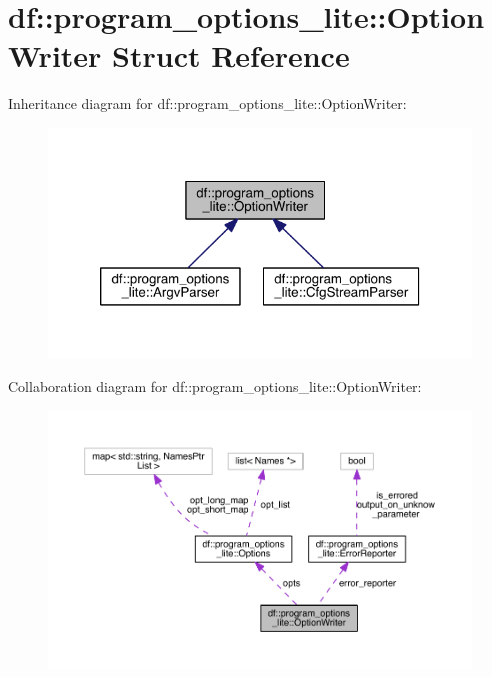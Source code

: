 \hypertarget{structdf_1_1program__options__lite_1_1_option_writer}{}\section{df\+:\+:program\+\_\+options\+\_\+lite\+:\+:Option\+Writer Struct Reference}
\label{structdf_1_1program__options__lite_1_1_option_writer}


Inheritance diagram for df\+:\+:program\+\_\+options\+\_\+lite\+:\+:Option\+Writer\+:
\nopagebreak
\begin{figure}[H]
\begin{center}
\leavevmode
\includegraphics[width=320pt]{df/d1f/structdf_1_1program__options__lite_1_1_option_writer__inherit__graph}
\end{center}
\end{figure}


Collaboration diagram for df\+:\+:program\+\_\+options\+\_\+lite\+:\+:Option\+Writer\+:
\nopagebreak
\begin{figure}[H]
\begin{center}
\leavevmode
\includegraphics[width=350pt]{de/d37/structdf_1_1program__options__lite_1_1_option_writer__coll__graph}
\end{center}
\end{figure}
